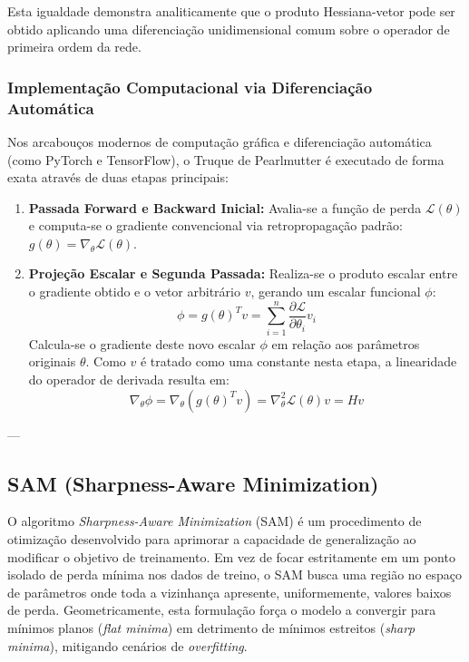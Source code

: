 \documentclass[12pt, a4paper]{article}
\begin{document}
Esta igualdade demonstra analiticamente que o produto Hessiana-vetor pode ser obtido aplicando uma diferenciação unidimensional comum sobre o operador de primeira ordem da rede.

\subsubsection{Implementação Computacional via Diferenciação Automática}
Nos arcabouços modernos de computação gráfica e diferenciação automática (como PyTorch e TensorFlow), o Truque de Pearlmutter é executado de forma exata através de duas etapas principais:
\begin{enumerate}
    \item \textbf{Passada Forward e Backward Inicial:} Avalia-se a função de perda $\mathcal{L}(\theta)$ e computa-se o gradiente convencional via retropropagação padrão: $g(\theta) = \nabla_{\theta} \mathcal{L}(\theta)$.
    \item \textbf{Projeção Escalar e Segunda Passada:} Realiza-se o produto escalar entre o gradiente obtido e o vetor arbitrário $v$, gerando um escalar funcional $\phi$:
    \begin{equation}
    \phi = g(\theta)^T v = \sum_{i=1}^n \frac{\partial \mathcal{L}}{\partial \theta_i} v_i
    \end{equation}
    Calcula-se o gradiente deste novo escalar $\phi$ em relação aos parâmetros originais $\theta$. Como $v$ é tratado como uma constante nesta etapa, a linearidade do operador de derivada resulta em:
    \begin{equation}
    \nabla_{\theta} \phi = \nabla_{\theta} (g(\theta)^T v) = \nabla_{\theta}^2 \mathcal{L}(\theta) v = H v
    \end{equation}
\end{enumerate}

---

\subsection{SAM (Sharpness-Aware Minimization)}
O algoritmo \textit{Sharpness-Aware Minimization} (SAM) é um procedimento de otimização desenvolvido para aprimorar a capacidade de generalização ao modificar o objetivo de treinamento. Em vez de focar estritamente em um ponto isolado de perda mínima nos dados de treino, o SAM busca uma região no espaço de parâmetros onde toda a vizinhança apresente, uniformemente, valores baixos de perda. Geometricamente, esta formulação força o modelo a convergir para mínimos planos (\textit{flat minima}) em detrimento de mínimos estreitos (\textit{sharp minima}), mitigando cenários de \textit{overfitting}.
\end{document}
